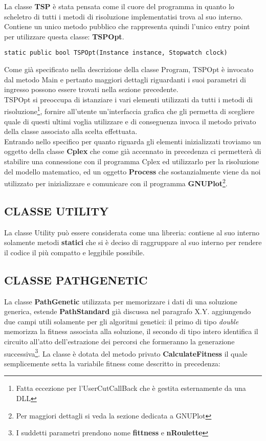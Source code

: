 \documentclass[11pt]{article}
\begin{document}
La classe \textbf{TSP} è stata pensata come il cuore del programma in quanto lo scheletro di tutti i metodi di risoluzione implementatisi trova al suo interno. Contiene un unico metodo pubblico che rappresenta quindi l'unico entry point per utilizzare questa classe: \textbf{TSPOpt}.

\begin{lstlisting}
static public bool TSPOpt(Instance instance, Stopwatch clock)
\end{lstlisting}

Come già specificato nella descrizione della classe Program, TSPOpt è invocato dal metodo Main e pertanto maggiori dettagli riguardanti i suoi parametri di ingresso possono essere trovati nella sezione precedente.\\
TSPOpt si preoccupa di istanziare i vari elementi utilizzati da tutti i metodi di risoluzione\footnote{Fatta eccezione per l'UserCutCallBack che è gestita esternamente da una DLL}, fornire all'utente un'interfaccia grafica che gli permetta di scegliere quale di questi ultimi voglia utilizzare e di conseguenza invoca il metodo privato della classe associato alla scelta effettuata.\\
Entrando nello specifico per quanto riguarda gli elementi inizializzati troviamo un oggetto della classe \textbf{Cplex} che come già accennato in precedenza ci permetterà di stabilire una connessione con il programma Cplex ed utilizzarlo per la risoluzione del modello matematico, ed un oggetto \textbf{Process} che sostanzialmente viene da noi utilizzato per inizializzare e comunicare con il programma \textbf{GNUPlot}\footnote{Per maggiori dettagli si veda la sezione dedicata a GNUPlot}.

\subsection*{CLASSE UTILITY}
\label{sec:ClasseUtilityS}

La classe Utility può essere considerata come una libreria: contiene al suo interno solamente metodi \textbf{statici} che si è deciso di raggruppare al suo interno per rendere il codice il più compatto e leggibile possibile.

\subsection{CLASSE PATHGENETIC}
\label{sec:ClassePathGeneticS}

La classe \textbf{PathGenetic} utilizzata per memorizzare i dati di una soluzione generica, estende \textbf{PathStandard} già discussa nel paragrafo X.Y. aggiungendo due campi utili solamente per gli algoritmi genetici: il primo di tipo \textit{double} memorizza la fitness associata alla soluzione, il secondo di tipo intero identifica il circuito all'atto dell'estrazione dei percorsi che formeranno la generazione successiva\footnote{I suddetti parametri prendono nome \textbf{fittness} e \textbf{nRoulette}}.
La classe è dotata del metodo privato \textbf{CalculateFitness} il quale semplicemente setta la variabile fitness come descritto in precedenza:
\end{document}
